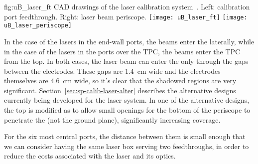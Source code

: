 \begin{dunefigure}{fig:uB_laser_ft}
{CAD drawings of the  laser calibration system~\cite{microboone}. Left: calibration port feedthrough. Right: laser beam periscope. %
}
\texttt{[image: uB\_laser\_ft]}
\texttt{[image: uB\_laser\_periscope]}
\end{dunefigure}


In the case of the lasers in the end-wall ports, the beams enter the  laterally, while in the case of the lasers in the ports over the TPC, the beams enter the TPC from the top. In both cases, the laser beam can enter the  only through the gaps between the  electrodes. These gaps are \SI{1.4}{\cm} wide and the electrodes themselves are \SI{4.6}{\cm} wide, so it's clear that the shadowed regions are very significant. Section~\ref{sec:sp-calib-laser-alter} describes the alternative designs currently being developed for the laser system. In one of the alternative designs, the top  is modified as to allow small openings for the bottom of the periscope to penetrate %
the  (not the ground plane), significantly increasing coverage.

For the six most central ports, the distance between them is small enough that we can consider having the same laser box serving two feedthroughs, in order to reduce the costs associated with the laser and its optics.


